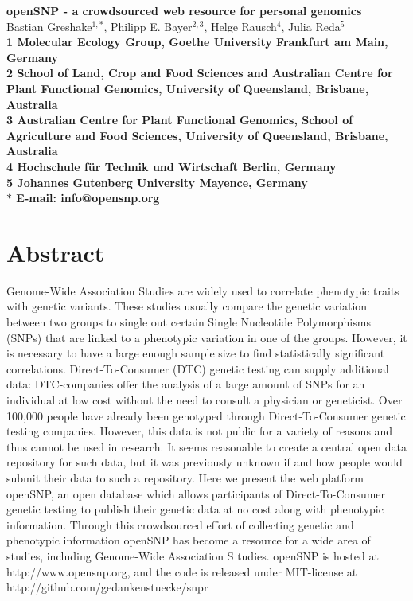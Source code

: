 \documentclass[10pt]{article}
\date{}
\begin{document}
\begin{flushleft}
{\Large
\textbf{openSNP - a crowdsourced web resource for personal genomics}
}
% 
\\
Bastian Greshake$^{1,\ast}$, 
Philipp E. Bayer$^{2,3}$, 
Helge Rausch$^{4}$,
Julia Reda$^{5}$
\\
\bf{1} Molecular Ecology Group, Goethe University Frankfurt am Main, Germany
\\
\bf{2} School of Land, Crop and Food Sciences and Australian Centre for Plant Functional Genomics, University of Queensland, Brisbane, Australia
\\
\bf{3} Australian Centre for Plant Functional Genomics, School of Agriculture and Food Sciences, University of Queensland, Brisbane, Australia
\\
\bf{4} Hochschule f\"ur Technik und Wirtschaft Berlin, Germany 
\\
\bf{5} Johannes Gutenberg University Mayence, Germany
\\
$\ast$ E-mail: info@opensnp.org
\end{flushleft}

\section*{Abstract}
Genome-Wide Association Studies are widely used to correlate phenotypic traits with genetic variants. These studies usually compare the genetic variation between two groups to single out certain Single Nucleotide Polymorphisms (SNPs) that are linked to a phenotypic variation in one of the groups. However, it is necessary to have a large enough sample size to find statistically significant correlations. Direct-To-Consumer (DTC) genetic testing can supply additional data: DTC-companies offer the analysis of a large amount of SNPs for an individual at low cost without the need to consult a physician or geneticist. Over 100,000 people have already been genotyped through Direct-To-Consumer genetic testing companies. However, this data is not public for a variety of reasons and thus cannot be used in research. It seems reasonable to create a central open data repository for such data, but it was previously unknown if and how people would submit their data to such a repository. Here 
we present the web platform openSNP, an open database which allows participants of Direct-To-Consumer genetic testing to publish their genetic data at no cost along with phenotypic information. Through this crowdsourced effort of collecting genetic and phenotypic information openSNP has become a 
resource for a wide area of studies, including Genome-Wide Association S
tudies. openSNP is hosted at http://www.opensnp.org, and the code is released under MIT-license at http://github.com/gedankenstuecke/snpr
\end{document}

